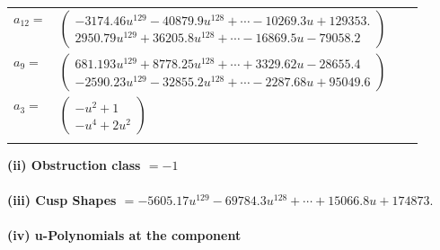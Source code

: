 \documentclass[1p]{elsarticle_modified}
\theoremstyle{definition}
\begin{document}
\begin{tabular}{m{7pt} m{180pt} m{7pt} m{180pt} }
\flushright $a_{12}=$&$\begin{pmatrix}-3174.46 u^{129}-40879.9 u^{128}+\cdots-10269.3 u+129353.\\2950.79 u^{129}+36205.8 u^{128}+\cdots-16869.5 u-79058.2\end{pmatrix}$ \\
\flushright $a_{9}=$&$\begin{pmatrix}681.193 u^{129}+8778.25 u^{128}+\cdots+3329.62 u-28655.4\\-2590.23 u^{129}-32855.2 u^{128}+\cdots-2287.68 u+95049.6\end{pmatrix}$ \\
\flushright $a_{3}=$&$\begin{pmatrix}- u^2+1\\- u^4+2 u^2\end{pmatrix}$\\&\end{tabular}
\flushleft \textbf{(ii) Obstruction class $= -1$}\\~\\
\flushleft \textbf{(iii) Cusp Shapes $= -5605.17 u^{129}-69784.3 u^{128}+\cdots+15066.8 u+174873.$}\\~\\
\newpage\renewcommand{\arraystretch}{1}
\flushleft \textbf{(iv) u-Polynomials at the component}\newline \\
\end{document}
